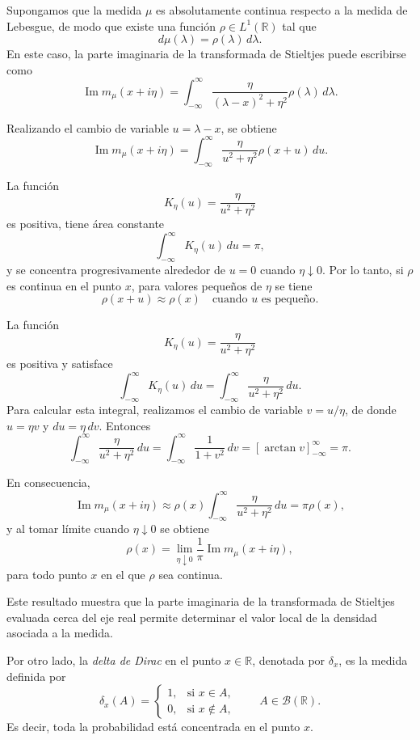 \documentclass[letterpaper,12pt,oneside]{book}
\begin{document}
Supongamos que la medida $\mu$ es absolutamente continua respecto a la medida de Lebesgue, de modo que existe una función $\rho \in L^1(\mathbb{R})$ tal que
\[
d\mu(\lambda)=\rho(\lambda)\,d\lambda.
\]
En este caso, la parte imaginaria de la transformada de Stieltjes puede escribirse como
\[
\operatorname{Im} m_\mu(x+i\eta)
=
\int_{-\infty}^{\infty}
\frac{\eta}{(\lambda-x)^2+\eta^2}
\rho(\lambda)\, d\lambda.
\]

Realizando el cambio de variable $u=\lambda-x$, se obtiene
\[
\operatorname{Im} m_\mu(x+i\eta)
=
\int_{-\infty}^{\infty}
\frac{\eta}{u^2+\eta^2}
\rho(x+u)\, du.
\]

La función
\[
K_\eta(u)=\frac{\eta}{u^2+\eta^2}
\]
es positiva, tiene área constante
\[
\int_{-\infty}^{\infty} K_\eta(u)\,du=\pi,
\]
y se concentra progresivamente alrededor de $u=0$ cuando $\eta\downarrow0$.
Por lo tanto, si $\rho$ es continua en el punto $x$, para valores pequeños de $\eta$ se tiene
\[
\rho(x+u)\approx\rho(x)
\quad \text{cuando } u \text{ es pequeño}.
\]

La función
\[
K_\eta(u)=\frac{\eta}{u^2+\eta^2}
\]
es positiva y satisface
\[
\int_{-\infty}^{\infty} K_\eta(u)\,du
=
\int_{-\infty}^{\infty}
\frac{\eta}{u^2+\eta^2}\,du.
\]
Para calcular esta integral, realizamos el cambio de variable
$v=u/\eta$, de donde $u=\eta v$ y $du=\eta\,dv$. Entonces
\[
\int_{-\infty}^{\infty}
\frac{\eta}{u^2+\eta^2}\,du
=
\int_{-\infty}^{\infty}
\frac{1}{1+v^2}\,dv
=
\left[\arctan v\right]_{-\infty}^{\infty}
=
\pi.
\]

En consecuencia,
\[
\operatorname{Im} m_\mu(x+i\eta)
\approx
\rho(x)
\int_{-\infty}^{\infty}
\frac{\eta}{u^2+\eta^2}\,du
=
\pi\rho(x),
\]
y al tomar límite cuando $\eta\downarrow0$ se obtiene
\[
\rho(x)
=
\lim_{\eta\downarrow0}
\frac{1}{\pi}
\operatorname{Im} m_\mu(x+i\eta),
\]
para todo punto $x$ en el que $\rho$ sea continua.

Este resultado muestra que la parte imaginaria de la transformada de Stieltjes evaluada cerca del eje real permite determinar el valor local de la densidad asociada a la medida.

Por otro lado, la \emph{delta de Dirac} en el punto $x \in \mathbb{R}$, denotada por $\delta_x$, es la medida definida por
\[
\delta_x(A)=
\begin{cases}
1, & \text{si } x \in A,\\
0, & \text{si } x \notin A,
\end{cases}
\qquad A \in \mathcal{B}(\mathbb{R}).
\]
Es decir, toda la probabilidad está concentrada en el punto $x$.
\end{document}
